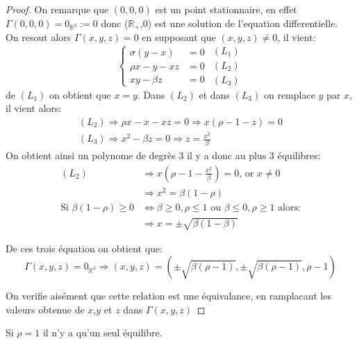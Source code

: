 \documentclass{article}
\newcommand{\R}{\mathbb{R}}
\newtheorem[M]{prop}{Proposition}[section]
\newtheorem[M]{propt}{Propriété}[section]
\newtheorem[L]{thm}{Théoreme}
\newtheorem[L]{cor}{Corollaire}
\begin{document}
\begin{proof}
On remarque que $(0,0,0)$ est un point stationnaire, en effet $\Gamma(0,0,0) = 0_{\R^3}:= 0$ donc ($\R_+$,0) est une solution de l'equation differentielle.\\
On resout alors $\Gamma(x,y,z)=0$ en supposant que $(x,y,z) \neq 0$, il vient:
\[
\left\{\begin{array}{rl} %
     \sigma(y-x)&=0  \\
     \rho x -y -xz&=0\\
     xy - \beta z&=0
\end{array}\right.
\begin{array}{c} %
    (L_1)\\
    (L_2)\\
    (L_3)
\end{array}
\]
de $(L_1)$ on obtient que $x=y$. Dans $(L_2)$ et dans $(L_3)$ on remplace $y$ par $x$, il vient alors:
\begin{gather*}
    (L_2) \Rightarrow \rho x - x - xz = 0 \Rightarrow x (\rho -1 -z ) = 0 \\
    (L_3) \Rightarrow x^2 - \beta z = 0 \Rightarrow z = \frac{x^2}{\beta}
\end{gather*}
On obtient ainsi un polynome de degrès 3 il y a donc au plus 3 équilibres:
\begin{align*}
    (L_2) & \Rightarrow x (\rho - 1 - \frac{x^2}{\beta}) = 0 \text{, or }x \neq 0\\
        & \Rightarrow x^2 = \beta (1-\rho)\\
    \text{Si } \beta(1-\rho) \ge 0 & \Leftrightarrow \beta \ge 0,\rho\le 1 \text{ ou } \beta \le 0,\rho\ge 1\text{ alors:}\\
    &\Rightarrow x = \pm \sqrt{\beta(1-\beta)}
\end{align*}

De ces trois équation on obtient que:
\[
    \Gamma(x,y,z)=0_{\R^3} \Rightarrow (x,y,z) = (\pm \sqrt{ \beta (\rho -1)} ,\pm \sqrt{\beta (\rho -1)}, \rho -1)
\]

On verifie aisément que cette relation est une \'equivalance, en ramplacant les valeurs obtenue de $x$,$y$ et $z$ dans $\Gamma(x,y,z)$
\end{proof}

\begin{example}[Remarque]
    Si $\rho=1$ il n'y a qu'un seul équilibre.
\end{example}
\end{document}
